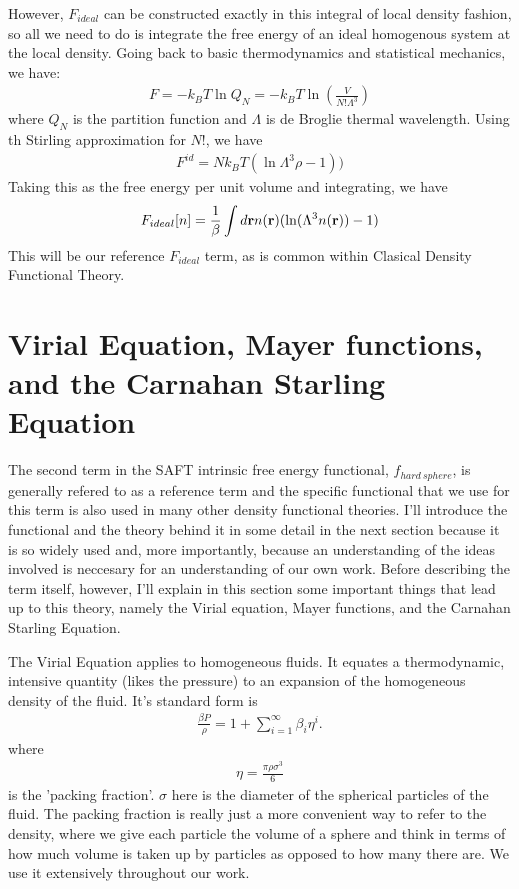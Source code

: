 However, $F_{ideal}$ can be constructed exactly in this integral of
local density fashion, so all we need to do is integrate the free
energy of an ideal homogenous system at the local density.  Going back
to basic thermodynamics and statistical mechanics, we have:
\begin{align}
  F = -k_BT \ln Q_N = -k_BT \ln (\frac{V}{N!\Lambda^3})
\end{align}
where $Q_N$ is the partition function and $\Lambda$ is de Broglie
thermal wavelength.  Using th Stirling approximation for $N!$, we have
\begin{align}
F^{id} = Nk_BT(\ln \Lambda^3 \rho - 1))
\end{align}
Taking this as the free energy per unit volume and integrating, we
have
\begin{align}
  F_{ideal}[n] = \frac{1}{\beta}\int d\textbf{r} n(\textbf{r})(\ln (\Lambda^3 n(\textbf{r}))-1)
\end{align}
This will be our reference $F_{ideal}$ term, as is common within
Clasical Density Functional Theory.

\clearpage
\newpage

\section{Virial Equation, Mayer functions, and the Carnahan Starling Equation}

The second term in the SAFT intrinsic free energy functional,
$f_{hard~sphere}$, is generally refered to as a reference term and the
specific functional that we use for this term is also used in many
other density functional theories.  I'll introduce the functional and
the theory behind it in some detail in the next section because it is
so widely used and, more importantly, because an understanding of the
ideas involved is neccesary for an understanding of our own work.
Before describing the term itself, however, I'll explain in this
section some important things that lead up to this theory, namely the
Virial equation, Mayer functions, and the Carnahan Starling Equation.

The Virial Equation applies to homogeneous fluids.  It equates a
thermodynamic, intensive quantity (likes the pressure) to an expansion
of the homogeneous density of the fluid.  It's standard form is
\begin{align}
  \label{eq:virial-expansion}
  \frac{\beta P}{\rho} = 1 + \sum_{i=1}^{\infty}\beta_i\eta^i.
\end{align}
where
\begin{align}
  \eta = \frac{\pi \rho \sigma^3}{6}
\end{align}
is the 'packing fraction'.  $\sigma$ here is the diameter of the
spherical particles of the fluid.  The packing fraction is really just
a more convenient way to refer to the density, where we give each particle the volume of a sphere and think in terms of how much volume is taken up by particles as opposed to how many there are.  We use it extensively
throughout our work.

